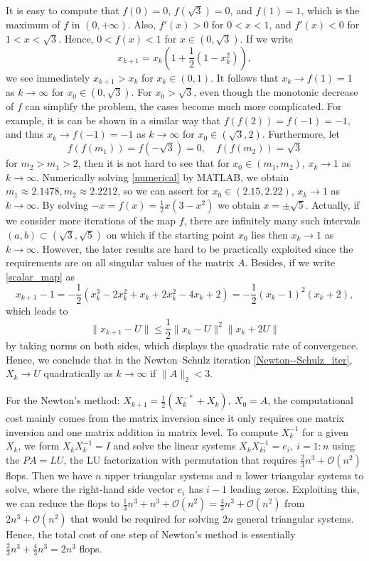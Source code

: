 \documentclass[12pt]{article}
\def\norm#1{\|#1\|}
\begin{document}
It is easy to compute that $f(0)=0$, $f(\sqrt{3})=0$, and $f(1)=1$, which is the 
maximum of $f$ in $(0,+\infty)$. Also, $f'(x)>0$ for $0<x<1$, and $f'(x)<0$ for 
$1<x<\sqrt{3}$. Hence, $0<f(x)<1$ for $x\in(0,\sqrt{3})$. If we write
$$
x_{k+1}=x_k(1+\frac{1}{2}(1-x_k^2)),
$$
we see immediately $x_{k+1}>x_k$ for $x_k\in (0,1)$. It follows that $x_k\to f(1)=1$ as $k\to \infty$ for $x_0\in (0,\sqrt{3})$. For $x_0>\sqrt{3}$, even though the monotonic decrease of $f$ can simplify the problem, the cases become much more complicated. For example, it is can be shown in a similar way that $f(f(2))=f(-1)=-1$, and thus $x_k\to f(-1)=-1$ as $k\to \infty$ for $x_0\in (\sqrt{3},2)$. Furthermore, let
\begin{equation}\label{numerical}
f(f(m_1))=f(-\sqrt{3})=0, \quad f(f(m_2))=\sqrt{3}
\end{equation}
for $m_2>m_1>2$, then it is not hard to see that for $x_0\in (m_1,m_2)$, $x_k\to 1$ as $k\to \infty$. Numerically solving \eqref{numerical} by MATLAB, we obtain $m_1\approx2.1478, m_2\approx2.2212$, so we can assert for $x_0\in (2.15,2.22)$, $x_k\to 1$ as $k\to \infty$. By solving $-x=f(x)=\frac{1}{2}x(3-x^2)$ we obtain $x=\pm \sqrt{5}$. Actually, if we consider more iterations of the map $f$, there are infinitely many such intervals $(a,b)\subset(\sqrt{3},\sqrt{5})$ on which if the starting point $x_0$ lies then $x_k\to 1$ as $k\to \infty$. However, the later results are hard to be practically exploited since the requirements are on all singular values of the matrix $A$. Besides, if we write \eqref{scalar_map} as 
$$
x_{k+1}-1 = -\frac{1}{2}(x_k^3-2x_k^2+x_k+2x_k^2-4x_k+2)
=-\frac{1}{2}(x_k-1)^2(x_k+2),
$$
which leads to 
$$
\norm{x_{k+1}-U}\le \frac{1}{2}\norm{x_{k}-U}^2\norm{x_{k}+2U}
$$
by taking norms on both sides, which displays the quadratic rate of convergence. Hence, we conclude that in the Newton--Schulz iteration \eqref{Newton--Schulz_iter}, $X_k\to U$ quadratically as $k\to\infty$ if $\norm{A}_2<3$.
 \vspace{.2cm}
 
 

 For the Newton's method: $X_{k+1} = \frac{1}{2}(X_k^{-*}+X_k),\ X_0=A$, the computational cost mainly comes from the matrix inversion since it only requires one matrix inversion and one matrix addition in matrix level. To compute $X_k^{-1}$ for a given $X_k$, we form $X_kX_k^{-1}=I$ and solve the linear systems $X_kX_{ki}^{-1}=e_i,\ i=1:n$ using the $PA=LU$, the LU factorization with permutation that requires $\frac{2}{3}n^3+\mathcal{O}(n^2)$ flops. Then we have $n$ upper triangular systems and $n$ lower triangular systems to solve, where the right-hand side vector $e_i$ has $i-1$ leading zeros. Exploiting this, we can reduce the flops to $\frac{1}{3}n^3+n^3+\mathcal{O}(n^2)=\frac{4}{3}n^3+\mathcal{O}(n^2)$ from $2n^3+\mathcal{O}(n^2)$ that would be required for solving $2n$ general triangular systems. Hence, the total cost of one step of Newton's method is essentially $\frac{2}{3}n^3+\frac{4}{3}n^3=2n^3$ flops. 
\end{document}
